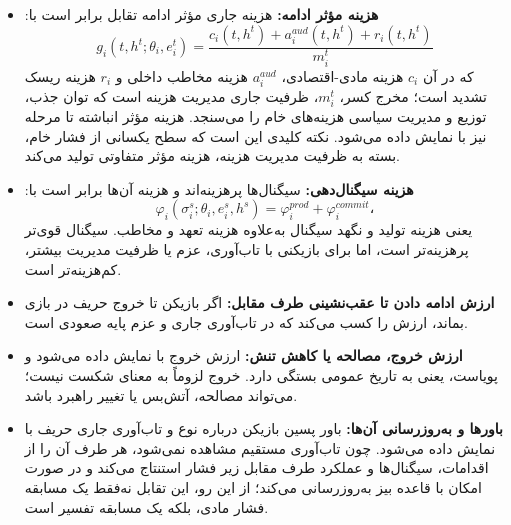 \documentclass[12pt]{article}
\begin{document}
\begin{itemize}
{\begin{itemize}
            \item 
             خروج/کاهش تنش/مصالحه/تغییر راهبرد ().
        \end{itemize}
        زمان توقف هر بازیکن نیز به‌صورت
        تعریف می‌شود.
    }
    \item {
        \textbf{هزینه مؤثر ادامه:}
        هزینه جاری مؤثر ادامه تقابل برابر است با:
\[
g_i(t,h^t;\theta_i,e_i^t) = \dfrac{c_i(t,h^t) + a_i^{aud}(t,h^t) + r_i(t,h^t)}{m_i^t}
\]
        که در آن
        $c_i$
        هزینه مادی-اقتصادی،
        $a_i^{aud}$
        هزینه مخاطب داخلی و
        $r_i$
        هزینه ریسک تشدید است؛ مخرج کسر،
        $m_i^t$،
        ظرفیت جاری مدیریت هزینه است که توان جذب، توزیع و مدیریت سیاسی هزینه‌های خام را می‌سنجد.
        هزینه مؤثر انباشته تا مرحله
        نیز با
        نمایش داده می‌شود. نکته کلیدی این است که سطح یکسانی از فشار خام، بسته به ظرفیت مدیریت هزینه، هزینه مؤثر متفاوتی تولید می‌کند.
    }
    \item {
        \textbf{هزینه سیگنال‌دهی:}
        سیگنال‌ها پرهزینه‌اند و هزینه آن‌ها برابر است با:
        \[
            \varphi_i(\sigma_i^s;\theta_i,e_i^s,h^s) = \varphi_i^{prod} + \varphi_i^{commit}،
        \]
        یعنی هزینه تولید و نگهد سیگنال به‌علاوه هزینه تعهد و مخاطب.
        سیگنال قوی‌تر پرهزینه‌تر است، اما برای بازیکنی با تاب‌آوری،
         عزم یا ظرفیت مدیریت بیشتر، کم‌هزینه‌تر است.
           }
    \item {
        \textbf{ارزش ادامه دادن تا عقب‌نشینی طرف مقابل:}
        اگر بازیکن تا خروج حریف در بازی بماند، ارزش
        را کسب می‌کند که در تاب‌آوری جاری و عزم پایه صعودی است.
    }
    \item {
        \textbf{ارزش خروج، مصالحه یا کاهش تنش:}
        ارزش خروج با
        نمایش داده می‌شود و پویاست، یعنی به تاریخ عمومی بستگی دارد.
        خروج لزوماً به معنای شکست نیست؛ می‌تواند مصالحه، آتش‌بس یا تغییر راهبرد باشد.
    }
    \item {
        \textbf{باورها و به‌روزرسانی آن‌ها:}
        باور پسین بازیکن  درباره نوع و تاب‌آوری جاری حریف با
        نمایش داده می‌شود. چون تاب‌آوری مستقیم مشاهده نمی‌شود، هر طرف آن را از اقدامات،
        سیگنال‌ها و عملکرد طرف مقابل زیر فشار استنتاج می‌کند و در صورت امکان با قاعده بیز به‌روزرسانی می‌کند؛
        از این رو، این تقابل نه‌فقط یک مسابقه فشار مادی، بلکه یک مسابقه تفسیر است.
    }
\end{itemize}
\end{document}
